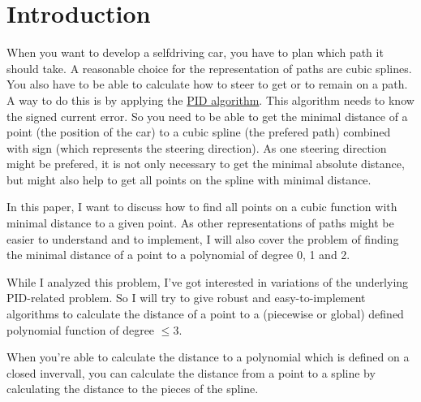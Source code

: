 \chapter*{Introduction}
When you want to develop a selfdriving car, you have to plan which path 
it should take. A reasonable choice for the representation of
paths are cubic splines. You also have to be able to calculate
how to steer to get or to remain on a path. A way to do this
is by applying the \href{https://en.wikipedia.org/wiki/PID_algorithm}{PID algorithm}.
This algorithm needs to know the signed current error. So you need to 
be able to get the minimal distance of a point (the position of the car)
to a cubic spline (the prefered path)
combined with sign (which represents the steering direction).
As one steering direction might be prefered, it is not only necessary to
get the minimal absolute distance, but might also help to get all points
on the spline with minimal distance.

In this paper, I want to discuss how to find all points on a cubic 
function with minimal distance to a given point.
As other representations of paths might be easier to understand and
to implement, I will also cover the problem of finding the minimal
distance of a point to a polynomial of degree 0, 1 and 2.

While I analyzed this problem, I've got interested in variations
of the underlying PID-related problem. So I will try to give
robust and easy-to-implement algorithms to calculate the distance
of a point to a (piecewise or global) defined polynomial function
of degree $\leq 3$.

When you're able to calculate the distance to a polynomial which is
defined on a closed invervall, you can calculate the distance from
a point to a spline by calculating the distance to the pieces of the
spline.
